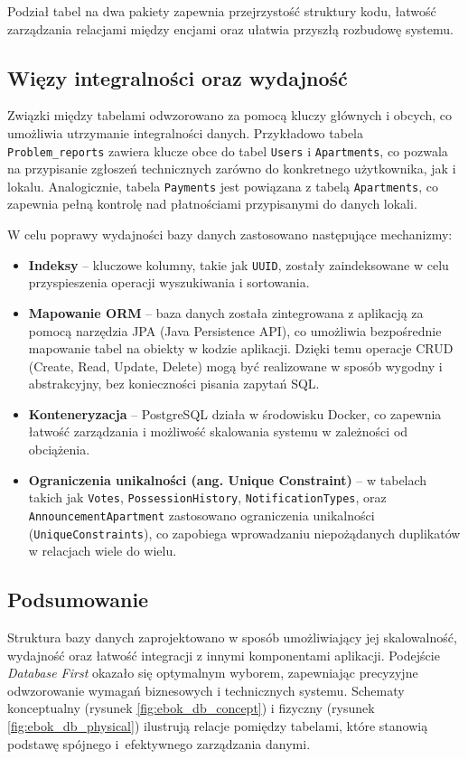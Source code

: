 Podział tabel na dwa pakiety zapewnia przejrzystość struktury kodu, łatwość zarządzania relacjami między encjami oraz ułatwia przyszłą rozbudowę systemu.


\subsection{Więzy integralności oraz wydajność}
Związki między tabelami odwzorowano za pomocą kluczy głównych i obcych, co umożliwia utrzymanie integralności danych. Przykładowo tabela \texttt{Problem\_reports} zawiera klucze obce do tabel \texttt{Users} i \texttt{Apartments}, co pozwala na przypisanie zgłoszeń technicznych zarówno do konkretnego użytkownika, jak i lokalu. Analogicznie, tabela \texttt{Payments} jest powiązana z tabelą \texttt{Apartments}, co zapewnia pełną kontrolę nad płatnościami przypisanymi do danych lokali.

W celu poprawy wydajności bazy danych zastosowano następujące mechanizmy:
\begin{itemize}
    \item \textbf{Indeksy} -- kluczowe kolumny, takie jak \texttt{UUID}, zostały zaindeksowane w celu przyspieszenia operacji wyszukiwania i sortowania.
    \item \textbf{Mapowanie ORM} -- baza danych została zintegrowana z aplikacją za pomocą narzędzia JPA (Java Persistence API), co umożliwia bezpośrednie mapowanie tabel na obiekty w kodzie aplikacji. Dzięki temu operacje CRUD (Create, Read, Update, Delete) mogą być realizowane w sposób wygodny i abstrakcyjny, bez konieczności pisania zapytań SQL.
    \item \textbf{Konteneryzacja} -- PostgreSQL działa w środowisku Docker, co zapewnia łatwość zarządzania i możliwość skalowania systemu w zależności od obciążenia.
		\item \textbf{Ograniczenia unikalności (ang. Unique Constraint)} -- w tabelach takich jak \texttt{Votes}, \texttt{PossessionHistory}, \texttt{NotificationTypes}, oraz \texttt{AnnouncementApartment} zastosowano ograniczenia unikalności (\texttt{UniqueConstraints}), co zapobiega wprowadzaniu niepożądanych duplikatów w relacjach wiele do wielu.
\end{itemize}

\subsection{Podsumowanie}

Struktura bazy danych zaprojektowano w sposób umożliwiający jej skalowalność, wydajność oraz łatwość integracji z innymi komponentami aplikacji. Podejście \emph{Database First} okazało się optymalnym wyborem, zapewniając precyzyjne odwzorowanie wymagań biznesowych i technicznych systemu. Schematy konceptualny (rysunek \ref{fig:ebok_db_concept}) i fizyczny (rysunek \ref{fig:ebok_db_physical}) ilustrują relacje pomiędzy tabelami, które stanowią podstawę spójnego i~efektywnego zarządzania danymi.


